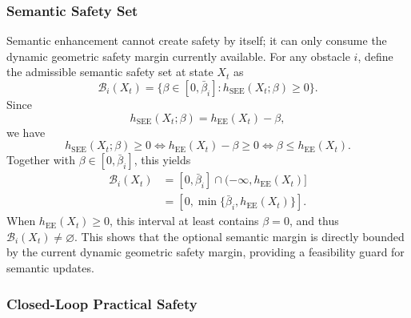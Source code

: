 \documentclass[journal]{IEEEtranTIE}
\begin{document}
    \subsubsection{Semantic Safety Set}
    Semantic enhancement cannot create safety by itself; it can only consume the
    dynamic geometric safety margin currently available. For any obstacle $i$,
    define the admissible semantic safety set at state $X_t$ as
    \begin{equation}
    \mathcal{B}_i(X_t)
    =
    \{\beta\in[0,\bar{\beta}_i]:
    h_{\mathrm{SEE}}(X_t;\beta)\ge0\}.
    \end{equation}
    Since
    \begin{equation}
    h_{\mathrm{SEE}}(X_t;\beta)=h_{\mathrm{EE}}(X_t)-\beta,
    \end{equation}
    we have
    \begin{equation}
    h_{\mathrm{SEE}}(X_t;\beta)\ge0
    \Longleftrightarrow
    h_{\mathrm{EE}}(X_t)-\beta\ge0
    \Longleftrightarrow
    \beta\le h_{\mathrm{EE}}(X_t).
    \end{equation}
    Together with $\beta\in[0,\bar{\beta}_i]$, this yields
    \begin{equation}
    \begin{aligned}
    \mathcal{B}_i(X_t)
    &=
    [0,\bar{\beta}_i]\cap(-\infty,h_{\mathrm{EE}}(X_t)]\\
    &=
    [0,\min\{\bar{\beta}_i,h_{\mathrm{EE}}(X_t)\}].
    \end{aligned}
    \end{equation}
    When $h_{\mathrm{EE}}(X_t)\ge0$, this interval at least contains
    $\beta=0$, and thus $\mathcal{B}_i(X_t)\neq\varnothing$. This shows that the
    optional semantic margin is directly bounded by the current dynamic
    geometric safety margin, providing a feasibility guard for semantic updates.

    \subsubsection{Closed-Loop Practical Safety}
\end{document}
